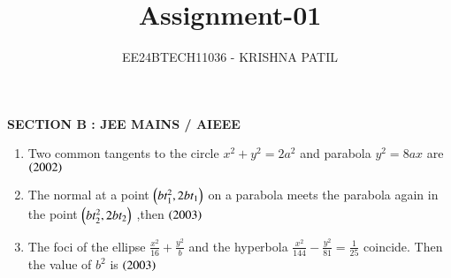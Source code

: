 \documentclass[journal,12pt,twocolumn]{IEEEtran}
\theoremstyle{remark}
\begin{document}

\vspace{3cm}

\title{Assignment-01}
\author{EE24BTECH11036 - KRISHNA PATIL}
\maketitle
\newpage
\bigskip

\renewcommand{\thefigure}{\theenumi}
\renewcommand{\thetable}{\theenumi}
\textbf{SECTION B : JEE MAINS / AIEEE}
\hfill
\begin{enumerate}
\item Two common tangents to the circle {$ x^2+y^2=2a^2 $} and parabola {$ y^2 = 8ax $} are \hfill{{$\left(2002\right) $}}
\begin{enumerate}[label=(\alph*)]
\end{enumerate}
\hfill
\item The normal at a point {$ \left(bt_1^2 ,2bt_1\right) $} on a parabola meets the parabola again in the point {$ \left(bt_2^2 ,2bt _2\right) $}  ,then \hfill {{$ \left(2003\right) $}}
\begin{enumerate}[label=(\alph*)]
\end{enumerate}
\hfill
\item The foci of the ellipse {$ \frac{x^2}{16} + \frac{y^2}{b} $} and the hyperbola {$ \frac{x^2}{144} - \frac{y^2}{81} = \frac{1}{25} $} coincide. Then the value of {$ b^2 $} is 
\hfill
\hfill {{$ \left(2003\right) $}}
\begin{enumerate}[label=(\alph*)]
\end{enumerate}
\end{enumerate}
\end{document}
